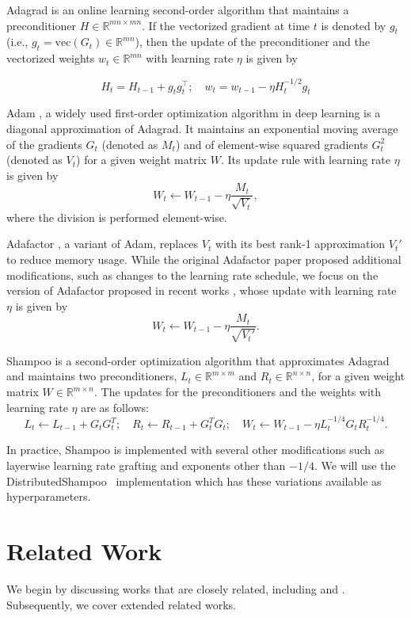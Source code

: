 \documentclass{article}
\begin{document}
Adagrad \citep{adagrad} is an online learning second-order algorithm that maintains a preconditioner $H \in \mathbb{R}^{mn \times mn}$. If the vectorized gradient at time $t$ is denoted by $g_t$ (i.e., $g_t = \text{vec}(G_t) \in \mathbb{R}^{mn}$), then the update of the preconditioner and the vectorized weights $w_t \in \mathbb{R}^{mn}$ with learning rate $\eta$ is given by

\[ H_t = H_{t-1} + g_t g_t^\top; \quad w_t = w_{t-1} - \eta H_t^{-1/2} g_t \]

Adam \citep{adam}, a widely used first-order optimization algorithm in 
deep learning is a diagonal approximation of Adagrad. It maintains an exponential moving average of the gradients 
$G_t$ (denoted as $M_t$) and of element-wise squared gradients $G_t^2$ 
(denoted as $V_t$) for a given weight matrix $W$. Its update rule with 
learning rate $\eta$ is given by
\[
W_t \leftarrow W_{t-1} - \eta \frac{M_t}{\sqrt{V_t}},
\]
where the division is performed element-wise.

Adafactor \citep{adafactor, zhai}, a variant of Adam, replaces $V_t$ with 
its best rank-1 approximation $V_t'$ to reduce memory usage. While the 
original Adafactor paper \citep{adafactor} proposed additional modifications, 
such as changes to the learning rate schedule, we focus on the version of 
Adafactor proposed in recent works \citep{zhai, zhaoscience}, whose update 
with learning rate $\eta$ is given by
\[
W_t \leftarrow W_{t-1} - \eta \frac{M_t}{\sqrt{V_t'}}.
\]

Shampoo \citep{shampoo} is a second-order optimization algorithm that approximates Adagrad and maintains two preconditioners, $L_t \in \mathbb{R}^{m \times m}$ and $R_t \in \mathbb{R}^{n \times n}$, for a given weight matrix $W \in 
\mathbb{R}^{m \times n}$. The updates for the preconditioners and the 
weights with learning rate $\eta$ are as follows:
\[
L_t \leftarrow L_{t-1} + G_tG_t^T; \quad R_t \leftarrow R_{t-1} + G_t^TG_t; 
\quad W_t \leftarrow W_{t-1} - \eta L_t^{-1/4} G_t R_t^{-1/4}.
\]

In practice, Shampoo is implemented with several other modifications such as layerwise learning rate grafting and exponents other than $-1/4$. We will use the DistributedShampoo~\citep{distributedshampoo} implementation which has these variations available as hyperparameters.

\section{Related Work}
\label{sec:related}
We begin by discussing works that are closely related, including \citet{ekfac, 
anil2020scalable} and \citet{galore}. Subsequently, we  cover extended related works.
\end{document}
